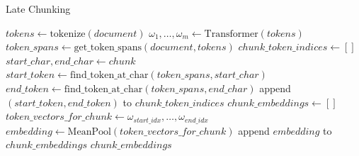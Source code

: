 \begin{algorithm}
\caption{Late Chunking}
\label{alg:late_chunking}
\begin{algorithmic}[1]
    \State $tokens \gets \text{tokenize}(document)$
    \State $\omega_1, \dots, \omega_m \gets \text{Transformer}(tokens)$ 
    \State $token\_spans \gets \text{get\_token\_spans}(document, tokens)$
    \State $chunk\_token\_indices \gets []$
        \State $start\_char, end\_char \gets chunk$
        \State $start\_token \gets \text{find\_token\_at\_char}(token\_spans, start\_char)$
        \State $end\_token \gets \text{find\_token\_at\_char}(token\_spans, end\_char)$
        \State append $(start\_token, end\_token)$ to $chunk\_token\_indices$
    \EndFor
    \State $chunk\_embeddings \gets []$
        \State $token\_vectors\_for\_chunk \gets \omega_{start\_idx}, \dots, \omega_{end\_idx}$
        \State $embedding \gets \text{MeanPool}(token\_vectors\_for\_chunk)$
        \State append $embedding$ to $chunk\_embeddings$
    \EndFor
    \State \Return $chunk\_embeddings$
\EndProcedure
\end{algorithmic}
\end{algorithm}